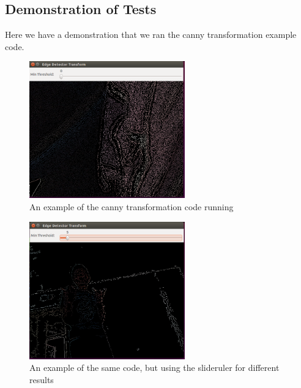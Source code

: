 \documentclass{article}
\begin{document}
\subsection*{Demonstration of Tests}
Here we have a demonstration that we ran the canny transformation example code.
\begin{figure}[H]
    \centering
    \includegraphics[width=0.6\textwidth]{Q4_1.png}
    \caption{An example of the canny transformation code running}
\end{figure}
\begin{figure}[H]
    \centering
    \includegraphics[width=0.6\textwidth]{Q4_2.png}
    \caption{An example of the same code, but using the slideruler for different results}
\end{figure}
\end{document}
